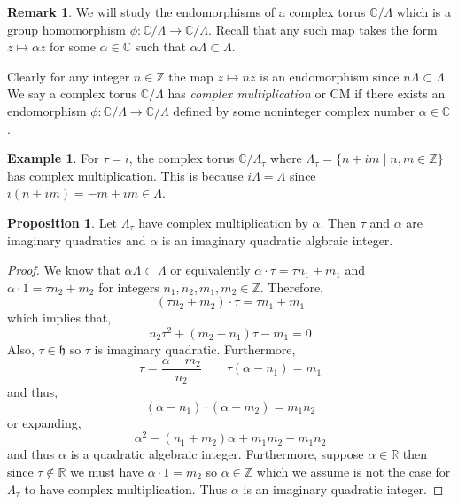 \documentclass{article}
\newcommand{\Z}{\mathbb{Z}}
\newcommand{\R}{\mathbb{R}}
\newcommand{\C}{\mathbb{C}}
\theoremstyle{definition}
\newtheorem{proposition}[theorem]{Proposition}
\newtheorem{example}[theorem]{Example}
\newtheorem{remark}{Remark}[section]
\newenvironment{definition}[1][Definition:]{\begin{trivlist}
\item[\hskip \labelsep {\bfseries #1}]}{\end{trivlist}}
\newcommand{\h}{\mathfrak{h}}
\begin{document}
\begin{remark}
We will study the endomorphisms of a complex torus $\C / \Lambda$ which is a group homomorphism $\phi : \C / \Lambda \to \C / \Lambda$. Recall that any such map takes the form $z \mapsto \alpha z$ for some $\alpha \in \C$ such that $\alpha \Lambda \subset \Lambda$.
\end{remark}

\begin{definition}
Clearly for any integer $n \in \Z$ the map $z \mapsto n z$ is an endomorphism since $n \Lambda \subset \Lambda$. We say a complex torus $\C / \Lambda$ has \textit{complex multiplication} or CM if there exists an endomorphism $\phi : \C / \Lambda \to \C / \Lambda$ defined by some noninteger complex number $\alpha \in \C$. 
\end{definition}

\begin{example}
For $\tau = i$, the complex torus $\C / \Lambda_\tau$ where $\Lambda_\tau = \{n + i m \mid n,m \in \Z \}$ has complex multiplication. This is because $i \Lambda = \Lambda$ since $i ( n + i m) = - m + i m \in \Lambda$. 
\end{example}

\begin{proposition}
Let $\Lambda_\tau$ have complex multiplication by $\alpha$. Then $\tau$ and $\alpha$ are imaginary quadratics and $\alpha$ is an imaginary quadratic algbraic integer. 
\end{proposition}

\begin{proof}
We know that $\alpha \Lambda \subset \Lambda$ or equivalently $\alpha \cdot \tau = \tau n_1 + m_1$ and $\alpha \cdot 1 = \tau n_2 + m_2$ for integers $n_1, n_2,m_1, m_2 \in \Z$. Therefore,
\[ (\tau n_2 + m_2) \cdot \tau = \tau n_1 + m_ 1 \]
which implies that,
\[ n_2 \tau^2 + (m_2 - n_1) \tau - m_1 = 0 \]
Also, $\tau \in \h$ so $\tau$ is imaginary quadratic. Furthermore,
\[ \tau = \frac{\alpha - m_2}{n_2} \quad \quad \tau (\alpha - n_1) = m_1 \]
and thus,
\[ (\alpha - n_1) \cdot (\alpha - m_2) = m_1 n_2 \]
or expanding,
\[ \alpha^2 - (n_1 + m_2) \alpha + m_1 m_2 - m_1 n_2 \]
and thus $\alpha$ is a quadratic algebraic integer. Furthermore, suppose $\alpha \in \R$ then since $\tau \notin \R$ we must have $\alpha \cdot 1 = m_2$ so $\alpha \in \Z$ which we assume is not the case for $\Lambda_\tau$ to have complex multiplication. Thus $\alpha$ is an imaginary quadratic integer. 
\end{proof}
\end{document}
